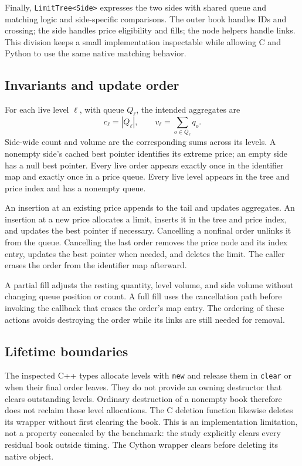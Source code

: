 \documentclass[10pt,letterpaper,twocolumn]{article}
\newcommand{\code}[1]{\texttt{#1}}
\begin{document}
Finally, \code{LimitTree<Side>} expresses the two sides with shared queue and
matching logic and side-specific comparisons. The outer book handles IDs
and crossing; the side handles price eligibility and fills; the node helpers
handle links. This division keeps a small implementation inspectable while
allowing C and Python to use the same native matching behavior.

\subsection{Invariants and update order}
For each live level $\ell$, with queue $Q_\ell$, the intended aggregates are
\begin{equation}
 c_\ell=|Q_\ell|,\qquad
 v_\ell=\sum_{o\in Q_\ell}q_o.
\end{equation}
Side-wide count and volume are the corresponding sums across its levels.
A nonempty side's cached best pointer identifies its extreme price; an empty
side has a null best pointer. Every live order appears exactly once in the
identifier map and exactly once in a price queue. Every live level appears
in the tree and price index and has a nonempty queue.

An insertion at an existing price appends to the tail and updates aggregates.
An insertion at a new price allocates a limit, inserts it in the tree and
price index, and updates the best pointer if necessary. Cancelling a nonfinal
order unlinks it from the queue. Cancelling the last order removes the price
node and its index entry, updates the best pointer when needed, and deletes
the limit. The caller erases the order from the identifier map afterward.

A partial fill adjusts the resting quantity, level volume, and side volume
without changing queue position or count. A full fill uses the cancellation
path before invoking the callback that erases the order's map entry. The
ordering of these actions avoids destroying the order while its links are
still needed for removal.

\subsection{Lifetime boundaries}
The inspected C++ types allocate levels with \code{new} and release them in
\code{clear} or when their final order leaves. They do not provide an owning
destructor that clears outstanding levels. Ordinary destruction of a nonempty
book therefore does not reclaim those level allocations. The C deletion
function likewise deletes its wrapper without first clearing the book.
This is an implementation limitation, not a property concealed by the
benchmark: the study explicitly clears every residual book outside timing.
The Cython wrapper clears before deleting its native object.
\end{document}
